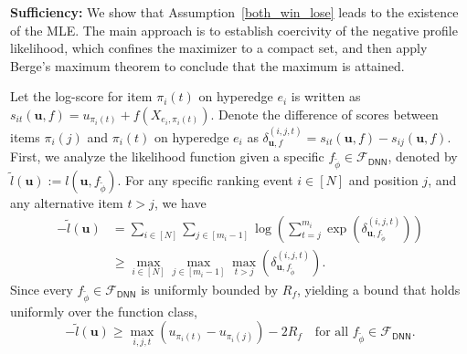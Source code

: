\documentclass[
  12pt]{article}
\begin{document}
\textbf{Sufficiency:} We show that Assumption~\ref{both_win_lose} leads to the existence of the MLE. The main approach is to establish coercivity of the negative profile likelihood, which confines the maximizer to a compact set, and then apply Berge's maximum theorem to conclude that the maximum is attained. 

Let the log-score for item $\pi_i(t)$ on hyperedge $e_i$ is written as $s_{i t}(\boldsymbol{u},f)={u}_{\pi_i(t)}+f(X_{e_i, \pi_i(t)})$. Denote the difference of scores between items $\pi_i(j)$ and $\pi_i(t)$ on hyperedge $e_i$ as $\delta_{\boldsymbol{u},f}^{(i, j, t)}=s_{i t}(\boldsymbol{u},f)-s_{i j}(\boldsymbol{u},f)$.  First, we analyze the likelihood function given a specific $f_{\widetilde{\phi}}\in \mathcal{F}_{\mathsf{DNN}}$, denoted by $\widetilde{l}(\boldsymbol{u}):= l (\boldsymbol{u},f_{\widetilde{\phi}})$. For any specific ranking event $i \in [N]$ and position $j$, and any alternative item $t > j$, we have
\begin{equation}
\begin{aligned}
-\widetilde{l}(\boldsymbol{u}) &= \sum_{i \in[N]} \sum_{j \in\left[m_i-1\right]} \log \left(\sum_{t=j}^{m_i} \exp \left(\delta_{\boldsymbol{u},f_{\widetilde{\phi}}}^{(i, j, t)}\right)\right) \\
&\geq \max_{i \in [N]} \max_{j \in [m_i-1]} \max_{t > j} \left( \delta_{\boldsymbol{u},f_{\widetilde{\phi}}}^{(i, j, t)} \right).
\end{aligned}
\end{equation}
Since every $f_{\widetilde{\phi}} \in \mathcal{F}_{\mathsf{DNN}}$ is uniformly bounded by $R_f$, yielding a bound that holds uniformly over the function class,
\begin{equation}
\label{eq:lower_bound}
-\widetilde{l}(\boldsymbol{u}) \geq \max_{i,j,t}\left(u_{\pi_i(t)} - u_{\pi_i(j)}\right) - 2R_f \quad \text{for all } f_{\widetilde{\phi}} \in \mathcal{F}_{\mathsf{DNN}}.
\end{equation}
\end{document}
